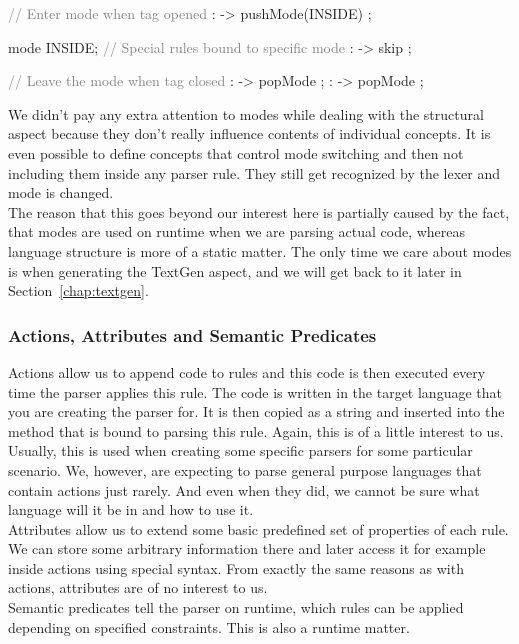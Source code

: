 \begin{antlr}
	\textcolor{gray}{// Enter mode when tag opened}
	        :   \literal{<}       -> pushMode(INSIDE) ;

	mode INSIDE;
	\textcolor{gray}{// Special rules bound to specific mode}
	           :    -> skip ;

	\textcolor{gray}{// Leave the mode when tag closed}
	       :   \literal{>}       -> popMode ;
	 :   \literal{/>}      -> popMode ;
\end{antlr}

We didn't pay any extra attention to modes while dealing with the structural aspect because they don't really influence contents of individual concepts.
It is even possible to define concepts that control mode switching and then not including them inside any parser rule.
They still get recognized by the lexer and mode is changed.
\\

The reason that this goes beyond our interest here is partially caused by the fact, that modes are used on runtime when we are parsing actual code, whereas language structure is more of a static matter.
The only time we care about modes is when generating the TextGen aspect, and we will get back to it later in Section~\ref{chap:textgen}.

\subsubsection{Actions, Attributes and Semantic Predicates}

Actions allow us to append code to rules and this code is then executed every time the parser applies this rule.
The code is written in the target language that you are creating the parser for.
It is then copied as a string and inserted into the method that is bound to parsing this rule.
Again, this is of a little interest to us.
Usually, this is used when creating some specific parsers for some particular scenario.
We, however, are expecting to parse general purpose languages that contain actions just rarely.
And even when they did, we cannot be sure what language will it be in and how to use it.
\\

Attributes allow us to extend some basic predefined set of properties of each rule.
We can store some arbitrary information there and later access it for example inside actions using special syntax.
From exactly the same reasons as with actions, attributes are of no interest to us.
\\

Semantic predicates tell the parser on runtime, which rules can be applied depending on specified constraints.
This is also a runtime matter.
